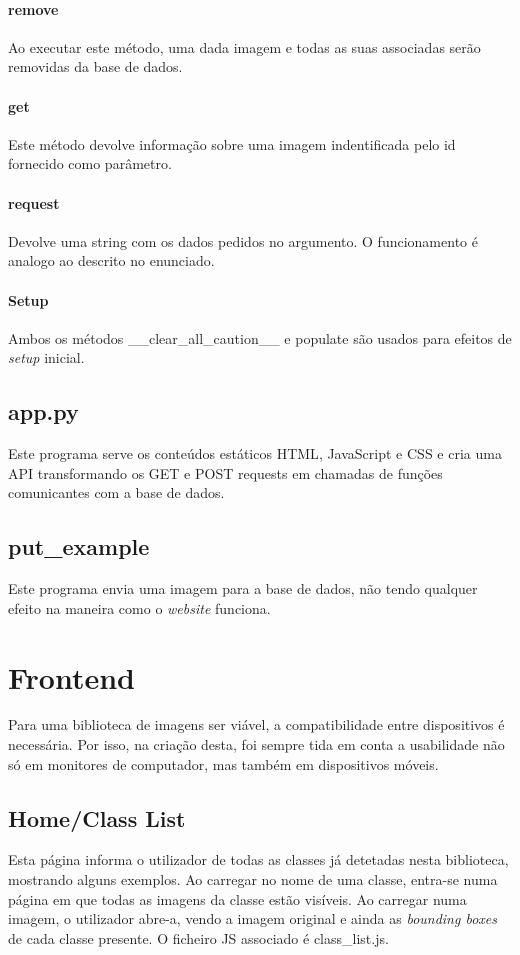 \documentclass{report}
\begin{document}
\paragraph{remove}
Ao executar este método, uma dada imagem e todas as suas associadas serão removidas da base de dados.

\paragraph{get}
Este método devolve informação sobre uma imagem indentificada pelo id fornecido como parâmetro.

\paragraph{request}

Devolve uma string com os dados pedidos no argumento. O funcionamento é analogo ao descrito no enunciado.


\paragraph{Setup}
Ambos os métodos \_\_clear\_all\_caution\_\_ e  populate são usados para efeitos de \textit{setup} inicial.

\subsection{app.py}
Este programa serve os conteúdos estáticos \ac{HTML}, JavaScript e \ac{CSS} e cria uma API transformando os GET e POST requests em chamadas de funções comunicantes com a base de dados. 

\subsection{put\_example}
Este programa envia uma imagem para a base de dados, não tendo qualquer efeito na maneira como o \textit{website} funciona.

\section{Frontend}
Para uma biblioteca de imagens ser viável, a compatibilidade entre dispositivos é necessária. Por isso, na criação desta, foi sempre tida em conta a usabilidade não só em monitores de computador, mas também em dispositivos móveis. 

\subsection{Home/Class List}
Esta página informa o utilizador de todas as classes já detetadas nesta biblioteca, mostrando alguns exemplos. Ao carregar no nome de uma classe, entra-se numa página em que todas as imagens da classe estão visíveis. Ao carregar numa imagem, o utilizador abre-a, vendo a imagem original e ainda as \textit{bounding boxes} de cada classe presente. O ficheiro \ac{JS} associado é class\_list.js.
\end{document}
